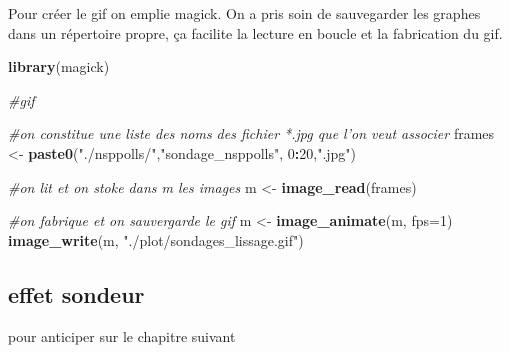 \documentclass[
]{book}
\newenvironment{Shaded}{\begin{snugshade}}{\end{snugshade}}
\newcommand{\CommentTok}[1]{\textcolor[rgb]{0.56,0.35,0.01}{\textit{#1}}}
\newcommand{\DataTypeTok}[1]{\textcolor[rgb]{0.13,0.29,0.53}{#1}}
\newcommand{\DecValTok}[1]{\textcolor[rgb]{0.00,0.00,0.81}{#1}}
\newcommand{\KeywordTok}[1]{\textcolor[rgb]{0.13,0.29,0.53}{\textbf{#1}}}
\newcommand{\NormalTok}[1]{#1}
\newcommand{\OperatorTok}[1]{\textcolor[rgb]{0.81,0.36,0.00}{\textbf{#1}}}
\newcommand{\StringTok}[1]{\textcolor[rgb]{0.31,0.60,0.02}{#1}}
\begin{document}
Pour créer le gif on emplie magick. On a pris soin de sauvegarder les graphes dans un répertoire propre, ça facilite la lecture en boucle et la fabrication du gif.

\begin{Shaded}
\begin{Highlighting}[]
\KeywordTok{library}\NormalTok{(magick)}

\CommentTok{#gif                                                     }

\CommentTok{#on constitue une liste des noms des fichier *.jpg que l'on veut associer                                                     }
\NormalTok{frames <-}\StringTok{ }\KeywordTok{paste0}\NormalTok{(}\StringTok{"./nsppolls/"}\NormalTok{,}\StringTok{"sondage_nsppolls"}\NormalTok{, }\DecValTok{0}\OperatorTok{:}\DecValTok{20}\NormalTok{,}\StringTok{".jpg"}\NormalTok{)}

\CommentTok{#on lit et on stoke dans m les images}
\NormalTok{m <-}\StringTok{ }\KeywordTok{image_read}\NormalTok{(frames)}

\CommentTok{#on fabrique et on sauvergarde le gif}
\NormalTok{m <-}\StringTok{ }\KeywordTok{image_animate}\NormalTok{(m, }\DataTypeTok{fps=}\DecValTok{1}\NormalTok{)}
\KeywordTok{image_write}\NormalTok{(m, }\StringTok{"./plot/sondages_lissage.gif"}\NormalTok{)}
\end{Highlighting}
\end{Shaded}

\hypertarget{effet-sondeur}{%
\subsection{effet sondeur}\label{effet-sondeur}}

pour anticiper sur le chapitre suivant
\end{document}
